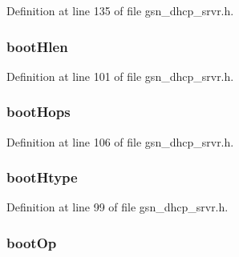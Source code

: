 Definition at line 135 of file gsn\_\-dhcp\_\-srvr.h.

\hypertarget{a00046_a366bc11312e460bb188070016094cf47}{
\subsubsection[{bootHlen}]{ {\bf bootHlen}}}
\label{a00046_a366bc11312e460bb188070016094cf47}


Definition at line 101 of file gsn\_\-dhcp\_\-srvr.h.

\hypertarget{a00046_a10c0d3467e6ca1d91a79eb52b8849b6b}{
\subsubsection[{bootHops}]{ {\bf bootHops}}}
\label{a00046_a10c0d3467e6ca1d91a79eb52b8849b6b}


Definition at line 106 of file gsn\_\-dhcp\_\-srvr.h.

\hypertarget{a00046_ad53ae5a864f26d2fbe06ad714b206ce0}{
\subsubsection[{bootHtype}]{ {\bf bootHtype}}}
\label{a00046_ad53ae5a864f26d2fbe06ad714b206ce0}


Definition at line 99 of file gsn\_\-dhcp\_\-srvr.h.

\hypertarget{a00046_a199e9ac2d94217d9267d3e09a3389144}{
\subsubsection[{bootOp}]{ {\bf bootOp}}}
\label{a00046_a199e9ac2d94217d9267d3e09a3389144}


